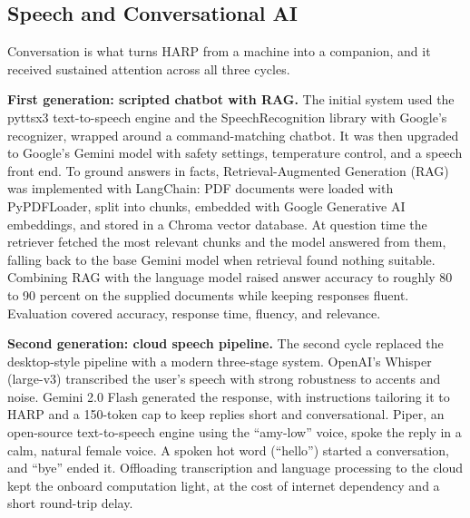 \documentclass[11pt,a4paper]{article}
\begin{document}
\subsection{Speech and Conversational AI}

Conversation is what turns HARP from a machine into a companion, and it received sustained attention across all three cycles.

\textbf{First generation: scripted chatbot with RAG.} The initial system used the pyttsx3 text-to-speech engine and the SpeechRecognition library with Google's recognizer, wrapped around a command-matching chatbot. It was then upgraded to Google's Gemini model with safety settings, temperature control, and a speech front end. To ground answers in facts, Retrieval-Augmented Generation (RAG) was implemented with LangChain: PDF documents were loaded with PyPDFLoader, split into chunks, embedded with Google Generative AI embeddings, and stored in a Chroma vector database. At question time the retriever fetched the most relevant chunks and the model answered from them, falling back to the base Gemini model when retrieval found nothing suitable. Combining RAG with the language model raised answer accuracy to roughly 80 to 90 percent on the supplied documents while keeping responses fluent. Evaluation covered accuracy, response time, fluency, and relevance.

\textbf{Second generation: cloud speech pipeline.} The second cycle replaced the desktop-style pipeline with a modern three-stage system. OpenAI's Whisper (large-v3) transcribed the user's speech with strong robustness to accents and noise. Gemini 2.0 Flash generated the response, with instructions tailoring it to HARP and a 150-token cap to keep replies short and conversational. Piper, an open-source text-to-speech engine using the ``amy-low'' voice, spoke the reply in a calm, natural female voice. A spoken hot word (``hello'') started a conversation, and ``bye'' ended it. Offloading transcription and language processing to the cloud kept the onboard computation light, at the cost of internet dependency and a short round-trip delay.
\end{document}
